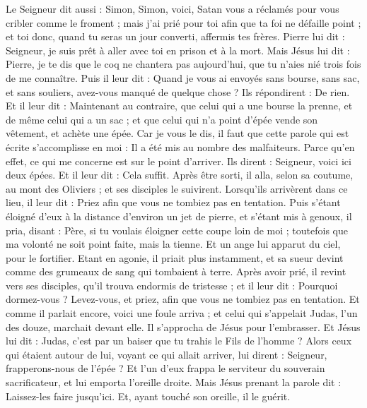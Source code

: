 \begin{multicols}{2}
{
Le Seigneur dit aussi : Simon, Simon, voici, Satan vous a réclamés pour vous cribler comme le froment ;
mais j'ai prié pour toi afin que ta foi ne défaille point ; et toi donc, quand tu seras un jour converti, affermis tes frères.
Pierre lui dit : Seigneur, je suis prêt à aller avec toi en prison et à la mort.
Mais Jésus lui dit : Pierre, je te dis que le coq ne chantera pas aujourd'hui, que tu n’aies nié trois fois de me connaître.
Puis il leur dit : Quand je vous ai envoyés sans bourse, sans sac, et sans souliers, avez-vous manqué de quelque chose ? Ils répondirent : De rien.
Et il leur dit : Maintenant au contraire, que celui qui a une bourse la prenne, et de même celui qui a un sac ; et que celui qui n'a point d'épée vende son vêtement, et achète une épée.
Car je vous le dis, il faut que cette parole qui est écrite s’accomplisse en moi : Il a été mis au nombre des malfaiteurs. Parce qu’en effet, ce qui me concerne est sur le point d’arriver.
Ils dirent : Seigneur, voici ici deux épées. Et il leur dit : Cela suffit.
\TextTitle{[Gethsémané]}
Après être sorti, il alla, selon sa coutume, au mont des Oliviers ; et ses disciples le suivirent.
Lorsqu’ils arrivèrent dans ce lieu, il leur dit : Priez afin que vous ne tombiez pas en tentation.
Puis s'étant éloigné d'eux à la distance d’environ un jet de pierre, et s'étant mis à genoux, il pria,
disant : Père, si tu voulais éloigner cette coupe loin de moi ; toutefois que ma volonté ne soit point faite, mais la tienne.
Et un ange lui apparut du ciel, pour le fortifier.
Etant en agonie, il priait plus instamment, et sa sueur devint comme des grumeaux de sang qui tombaient à terre.
Après avoir prié, il revint vers ses disciples, qu’il trouva endormis de tristesse ;
et il leur dit : Pourquoi dormez-vous ? Levez-vous, et priez, afin que vous ne tombiez pas en tentation.
Et comme il parlait encore, voici une foule arriva ; et celui qui s’appelait Judas, l'un des douze, marchait devant elle. Il s’approcha de Jésus pour l’embrasser.
Et Jésus lui dit : Judas, c’est par un baiser que tu trahis le Fils de l'homme ?
Alors ceux qui étaient autour de lui, voyant ce qui allait arriver, lui dirent : Seigneur, frapperons-nous de l'épée ?
Et l'un d'eux frappa le serviteur du souverain sacrificateur, et lui emporta l'oreille droite.
Mais Jésus prenant la parole dit : Laissez-les faire jusqu’ici. Et, ayant touché son oreille, il le guérit.
}
\end{multicols}
